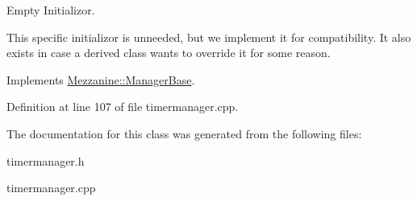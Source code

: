 Empty Initializor. 

This specific initializor is unneeded, but we implement it for compatibility. It also exists in case a derived class wants to override it for some reason. 

Implements \hyperlink{classMezzanine_1_1ManagerBase_a864e3cac11928a602c1db28fa2d52ee2}{Mezzanine::ManagerBase}.



Definition at line 107 of file timermanager.cpp.



The documentation for this class was generated from the following files:\begin{DoxyCompactItemize}
\item 
timermanager.h\item 
timermanager.cpp\end{DoxyCompactItemize}
